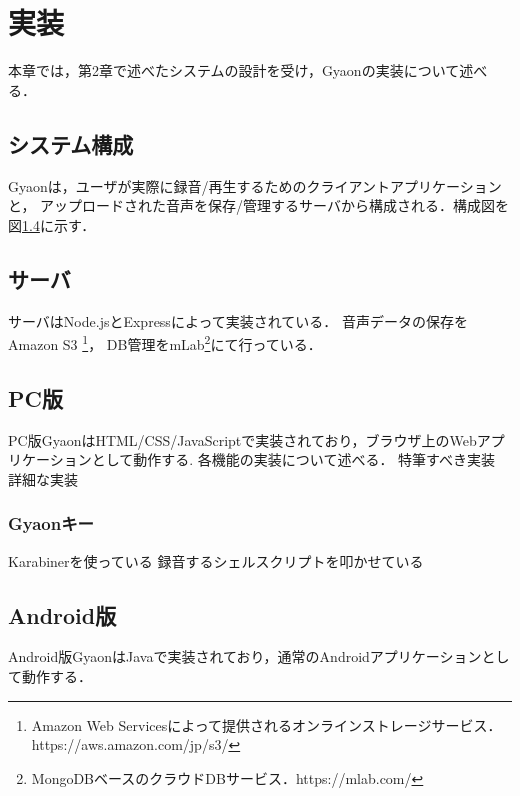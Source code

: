 \chapter{実装}
\label{chap:implementation}

本章では，第2章で述べたシステムの設計を受け，Gyaonの実装について述べる．

\newpage

\section{システム構成}
Gyaonは，ユーザが実際に録音/再生するためのクライアントアプリケーションと，
アップロードされた音声を保存/管理するサーバから構成される．構成図を図\ref{}に示す．




\section{サーバ}
サーバはNode.jsとExpressによって実装されている．
音声データの保存をAmazon S3
\footnote{\textsf{Amazon Web Servicesによって提供されるオンラインストレージサービス．https://aws.amazon.com/jp/s3/}}，
DB管理をmLab\footnote{\textsf{MongoDBベースのクラウドDBサービス．https://mlab.com/}}にて行っている．

\section{PC版}
PC版GyaonはHTML/CSS/JavaScriptで実装されており，ブラウザ上のWebアプリケーションとして動作する.
各機能の実装について述べる．
特筆すべき実装
詳細な実装

\subsection{Gyaonキー}
Karabinerを使っている
録音するシェルスクリプトを叩かせている

\section{Android版}
Android版GyaonはJavaで実装されており，通常のAndroidアプリケーションとして動作する．
